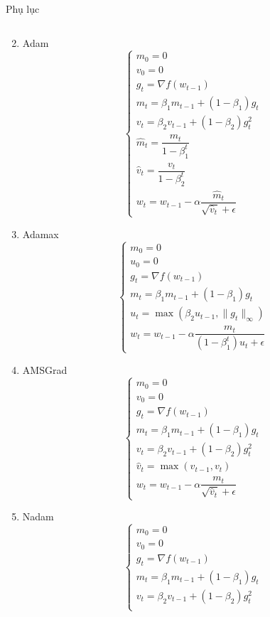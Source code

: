 \documentclass[10pt]{beamer}
\theoremstyle{remark}
\theoremstyle{definition}
\begin{document}
\begin{frame}[allowframebreaks]{Phụ lục}
\begin{enumerate}
\begin{equation*}
		\end{equation*}
		\item Adam
		\begin{equation*}
			\begin{cases}m_0 = 0\\ v_0 = 0\\ g_t = \nabla f(w_{t-1}) \\ m_t = \beta_1 m_{t-1} + (1-\beta_1) g_t \\ v_t = \beta_2 v_{t-1} + (1-\beta_2)g_t^2 \\
				\hat{m}_t = \dfrac{m_t}{1 - \beta_1^t} \\ \hat{v}_t = \dfrac{v_t}{1 - \beta_2^t} \\ w_t = w_{t-1} - \alpha \dfrac{\hat{m}_t}{\sqrt{\hat{v}_t} + \epsilon} \end{cases}
		\end{equation*}
		\item Adamax
		\begin{equation*}
			\begin{cases}m_0 = 0\\ u_0 = 0 \\ g_t = \nabla f(w_{t-1}) \\ m_t = \beta_1 m_{t-1} + (1-\beta_1) g_t \\ u_t = \max(\beta_2 u_{t-1}, \lVert g_t \rVert_{\infty}) \\ w_t = w_{t-1} - \alpha \dfrac{m_t}{(1 - \beta_1^t)u_t + \epsilon}\end{cases}
		\end{equation*}
		\item AMSGrad
		\begin{equation*}
			\begin{cases}m_0 = 0\\ v_0 = 0\\ g_t = \nabla f(w_{t-1}) \\ m_t = \beta_1 m_{t-1} + (1-\beta_1) g_t \\ v_t = \beta_2 v_{t-1} + (1-\beta_2)g_t^2 \\ \hat{v}_t = \max(\hat{v}_{t-1}, v_t) \\ w_t = w_{t-1} - \alpha \dfrac{m_t}{\sqrt{\hat{v}_t} + \epsilon} \end{cases}
		\end{equation*}
		\item Nadam
		\begin{equation*}
			\begin{cases}m_0 = 0\\ v_0 = 0\\ g_t = \nabla f(w_{t-1}) \\ m_t = \beta_1 m_{t-1} + (1-\beta_1) g_t \\ v_t = \beta_2 v_{t-1} + (1-\beta_2)g_t^2 \\

\end{cases}
\end{equation*}
\end{enumerate}
\end{frame}
\end{document}
